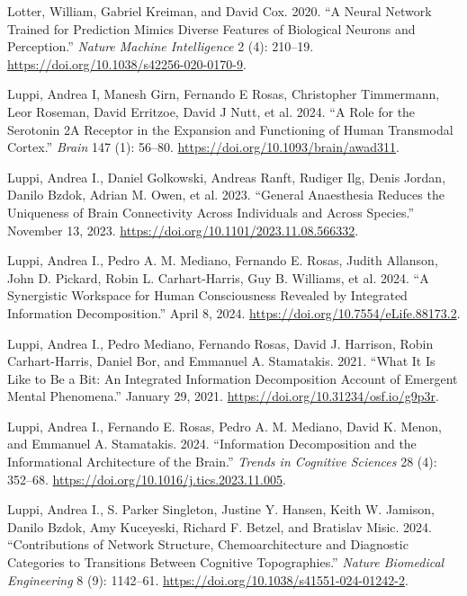 \documentclass[
  a4paper]{article}
\newlength{\cslhangindent}
\newenvironment{CSLReferences}[2] %
 {\begin{list}{}{%
  \setlength{\itemindent}{0pt}
  \setlength{\leftmargin}{0pt}
  \setlength{\parsep}{0pt}
  \ifodd #1
   \setlength{\leftmargin}{\cslhangindent}
   \setlength{\itemindent}{-1\cslhangindent}
  \fi
  \setlength{\itemsep}{#2\baselineskip}}}
 {\end{list}}
\begin{document}
\begin{CSLReferences}{1}{0}
Lotter, William, Gabriel Kreiman, and David Cox. 2020. {``A Neural
Network Trained for Prediction Mimics Diverse Features of Biological
Neurons and Perception.''} \emph{Nature Machine Intelligence} 2 (4):
210--19. \url{https://doi.org/10.1038/s42256-020-0170-9}.

Luppi, Andrea I, Manesh Girn, Fernando E Rosas, Christopher Timmermann,
Leor Roseman, David Erritzoe, David J Nutt, et al. 2024. {``A Role for
the Serotonin {2A} Receptor in the Expansion and Functioning of Human
Transmodal Cortex.''} \emph{Brain} 147 (1): 56--80.
\url{https://doi.org/10.1093/brain/awad311}.

Luppi, Andrea I., Daniel Golkowski, Andreas Ranft, Rudiger Ilg, Denis
Jordan, Danilo Bzdok, Adrian M. Owen, et al. 2023. {``General
Anaesthesia Reduces the Uniqueness of Brain Connectivity Across
Individuals and Across Species.''} November 13, 2023.
\url{https://doi.org/10.1101/2023.11.08.566332}.

Luppi, Andrea I., Pedro A. M. Mediano, Fernando E. Rosas, Judith
Allanson, John D. Pickard, Robin L. Carhart-Harris, Guy B. Williams, et
al. 2024. {``A Synergistic Workspace for Human Consciousness Revealed by
Integrated Information Decomposition.''} April 8, 2024.
\url{https://doi.org/10.7554/eLife.88173.2}.

Luppi, Andrea I., Pedro Mediano, Fernando Rosas, David J. Harrison,
Robin Carhart-Harris, Daniel Bor, and Emmanuel A. Stamatakis. 2021.
{``What It Is Like to Be a Bit: {An} Integrated Information
Decomposition Account of Emergent Mental Phenomena.''} January 29, 2021.
\url{https://doi.org/10.31234/osf.io/g9p3r}.

Luppi, Andrea I., Fernando E. Rosas, Pedro A. M. Mediano, David K.
Menon, and Emmanuel A. Stamatakis. 2024. {``Information Decomposition
and the Informational Architecture of the Brain.''} \emph{Trends in
Cognitive Sciences} 28 (4): 352--68.
\url{https://doi.org/10.1016/j.tics.2023.11.005}.

Luppi, Andrea I., S. Parker Singleton, Justine Y. Hansen, Keith W.
Jamison, Danilo Bzdok, Amy Kuceyeski, Richard F. Betzel, and Bratislav
Misic. 2024. {``Contributions of Network Structure, Chemoarchitecture
and Diagnostic Categories to Transitions Between Cognitive
Topographies.''} \emph{Nature Biomedical Engineering} 8 (9): 1142--61.
\url{https://doi.org/10.1038/s41551-024-01242-2}.


\end{CSLReferences}
\end{document}

